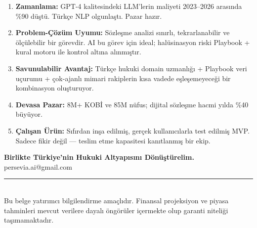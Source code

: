 \documentclass[12pt,a4paper]{article}
\begin{document}
\begin{highlightbox}
\begin{enumerate}[leftmargin=*, itemsep=6pt]
  \item \textbf{Zamanlama:} GPT-4 kalitesindeki LLM'lerin maliyeti 2023–2026 arasında \%90
  düştü. Türkçe NLP olgunlaştı. Pazar hazır.

  \item \textbf{Problem-Çözüm Uyumu:} Sözleşme analizi sınırlı, tekrarlanabilir ve ölçülebilir
  bir görevdir. AI bu görev için ideal; halüsinasyon riski Playbook + kural motoru ile kontrol
  altına alınmıştır.

  \item \textbf{Savunulabilir Avantaj:} Türkçe hukuki domain uzmanlığı + Playbook veri uçurumu +
  çok-ajanlı mimari rakiplerin kısa vadede eşleşemeyeceği bir kombinasyon oluşturuyor.

  \item \textbf{Devasa Pazar:} 8M+ KOBİ ve 85M nüfus; dijital sözleşme hacmi yılda \%40 büyüyor.

  \item \textbf{Çalışan Ürün:} Sıfırdan inşa edilmiş, gerçek kullanıcılarla test edilmiş MVP.
  Sadece fikir değil — teslim etme kapasitesi kanıtlanmış bir ekip.
\end{enumerate}
\end{highlightbox}

\vspace{1.5em}

\begin{center}
{\color{primary}\Large\textbf{Birlikte Türkiye'nin Hukuki Altyapısını Dönüştürelim.}}\\[1em]
{\color{muted}\normalsize persevia.ai@gmail.com}
\end{center}

\vspace{2em}
\begin{center}
\rule{8cm}{0.4pt}\\[0.5em]
{\small\color{muted}Bu belge yatırımcı bilgilendirme amaçlıdır. Finansal projeksiyon ve piyasa
tahminleri mevcut verilere dayalı öngörüler içermekte olup garanti niteliği taşımamaktadır.}
\end{center}
\end{document}
